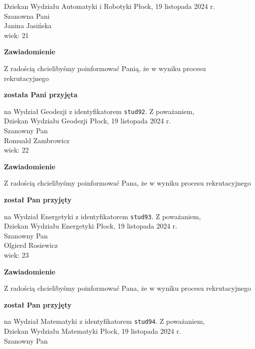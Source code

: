 \documentclass[12pt,a4paper]{article}
\begin{document}
Dziekan
Wydziału Automatyki i Robotyki
\newpage
\hfill Płock, 19 listopada 2024 r. \\
\noindent
Szanowna Pani \\
Janina Jasińska \\
wiek: 21
\bigskip
\begin{center}
    {\Large\textbf{Zawiadomienie}}
\end{center}
\bigskip 
Z radością chcielibyśmy poinformować Panią, że w wyniku procesu rekrutacyjnego
\begin{center}
\textsf{\textbf{została Pani przyjęta}}
\end{center}
na Wydział Geodezji z identyfikatorem \verb|stud92|. 
\vspace{2cm}
\noindent
Z poważaniem, \\
Dziekan
Wydziału Geodezji
\newpage
\hfill Płock, 19 listopada 2024 r. \\
\noindent
Szanowny Pan \\
Romuald Zambrowicz \\
wiek: 22
\bigskip
\begin{center}
    {\Large\textbf{Zawiadomienie}}
\end{center}
\bigskip 
Z radością chcielibyśmy poinformować Pana, że w wyniku procesu rekrutacyjnego
\begin{center}
\textsf{\textbf{został Pan przyjęty}}
\end{center}
na Wydział Energetyki z identyfikatorem \verb|stud93|. 
\vspace{2cm}
\noindent
Z poważaniem, \\
Dziekan
Wydziału Energetyki
\newpage
\hfill Płock, 19 listopada 2024 r. \\
\noindent
Szanowny Pan \\
Olgierd Rosiewicz \\
wiek: 23
\bigskip
\begin{center}
    {\Large\textbf{Zawiadomienie}}
\end{center}
\bigskip 
Z radością chcielibyśmy poinformować Pana, że w wyniku procesu rekrutacyjnego
\begin{center}
\textsf{\textbf{został Pan przyjęty}}
\end{center}
na Wydział Matematyki z identyfikatorem \verb|stud94|. 
\vspace{2cm}
\noindent
Z poważaniem, \\
Dziekan
Wydziału Matematyki
\newpage
\hfill Płock, 19 listopada 2024 r. \\
\noindent
Szanowny Pan \\
\end{document}
